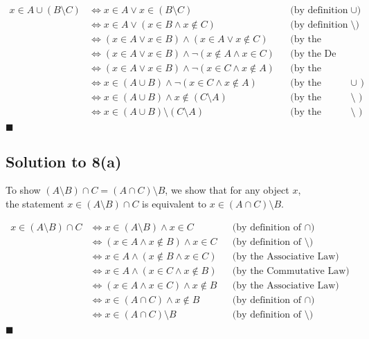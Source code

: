 \documentclass{scrartcl}
\begin{document}
    \begin{align*}
        x \in A \cup (B \setminus C)
        &\Leftrightarrow x \in A \vee x \in (B \setminus C)
        && \text{(by definition of $\cup$)} \\
        &\Leftrightarrow x \in A \vee (x \in B \wedge x \notin C)
        && \text{(by definition of $\setminus$)} \\
        &\Leftrightarrow (x \in A \vee x \in B) \wedge (x \in A \vee x \notin C)
        && \text{(by the Distributive Law )} \\
        &\Leftrightarrow (x \in A \vee x \in B) \wedge \neg (x \notin A \wedge x \in C)
        && \text{(by the De Morgan Law )} \\
        &\Leftrightarrow (x \in A \vee x \in B) \wedge \neg (x \in C \wedge x \notin A)
        && \text{(by the Commutative Law )} \\
        &\Leftrightarrow x \in (A \cup B) \wedge \neg (x \in C \wedge x \notin A)
        && \text{(by the definition of $\cup$ )} \\
        &\Leftrightarrow x \in (A \cup B) \wedge x \notin (C \setminus A)
        && \text{(by the definition of $\setminus$ )} \\
        &\Leftrightarrow x \in (A \cup B) \setminus (C \setminus A)
        && \text{(by the definition of $\setminus$ )} \\
    \end{align*}
    \hfill $\blacksquare$

    \subsection*{Solution to 8(a)}
    To show $(A \setminus B) \cap C = (A \cap C) \setminus B$, we show that for any object $x$, \\
    the statement $x \in (A \setminus B) \cap C$ is equivalent to $x \in (A \cap C) \setminus B$.

    \begin{align*}
        x \in (A \setminus B) \cap C
        &\Leftrightarrow x \in (A \setminus B) \wedge x \in C
        && \text{(by definition of $\cap$)} \\
        &\Leftrightarrow (x \in A \wedge x \notin B) \wedge x \in C
        && \text{(by definition of $\setminus$)} \\
        &\Leftrightarrow x \in A \wedge (x \notin B \wedge x \in C)
        && \text{(by the Associative Law)} \\
        &\Leftrightarrow x \in A \wedge (x \in C \wedge x \notin B)
        && \text{(by the Commutative Law)} \\
        &\Leftrightarrow (x \in A \wedge x \in C) \wedge x \notin B
        && \text{(by the Associative Law)} \\
        &\Leftrightarrow x \in (A \cap C) \wedge x \notin B
        && \text{(by definition of $\cap$)} \\
        &\Leftrightarrow x \in (A \cap C) \setminus B
        && \text{(by definition of $\setminus$)} \\
    \end{align*}
    \hfill $\blacksquare$
\end{document}
